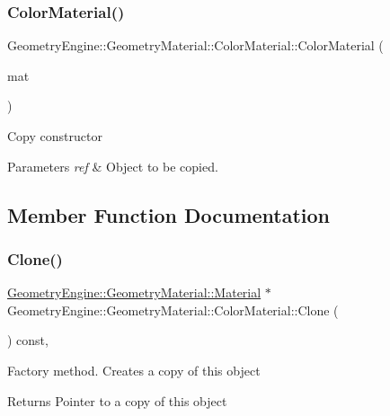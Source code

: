 \subsubsection{\texorpdfstring{ColorMaterial()}{ColorMaterial()}\hspace{0.1cm}{\footnotesize\ttfamily [2/2]}}
{\footnotesize\ttfamily Geometry\+Engine\+::\+Geometry\+Material\+::\+Color\+Material\+::\+Color\+Material (\begin{DoxyParamCaption}\item[{const \mbox{\hyperlink{class_geometry_engine_1_1_geometry_material_1_1_color_material}{Color\+Material}} \&}]{mat }\end{DoxyParamCaption})}

Copy constructor 
\begin{DoxyParams}{Parameters}
{\em ref} & Object to be copied. \\
\hline
\end{DoxyParams}


\subsection{Member Function Documentation}
\mbox{\label{class_geometry_engine_1_1_geometry_material_1_1_color_material_a29dbf04e76b75fcc86f184d072bba0a5}} 
\subsubsection{\texorpdfstring{Clone()}{Clone()}}
{\footnotesize\ttfamily \mbox{\hyperlink{class_geometry_engine_1_1_geometry_material_1_1_material}{Geometry\+Engine\+::\+Geometry\+Material\+::\+Material}} $\ast$ Geometry\+Engine\+::\+Geometry\+Material\+::\+Color\+Material\+::\+Clone (\begin{DoxyParamCaption}{ }\end{DoxyParamCaption}) const\hspace{0.3cm}{\ttfamily [override]}, {\ttfamily [virtual]}}

Factory method. Creates a copy of this object \begin{DoxyReturn}{Returns}
Pointer to a copy of this object 
\end{DoxyReturn}


